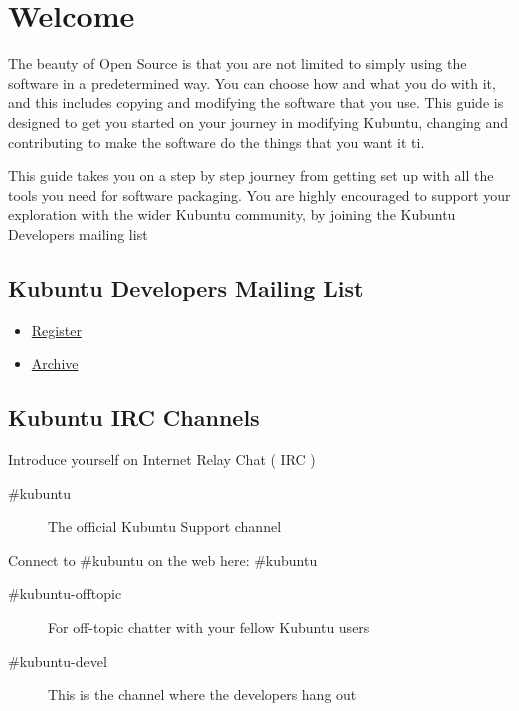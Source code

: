 \documentclass[letterpaper,10pt,english]{sphinxmanual}
\begin{document}
\section{Welcome}
\label{\detokenize{docs/packaging_guide/welcome::doc}}\label{\detokenize{docs/packaging_guide/welcome:welcome}}
The beauty of Open Source is that you are not limited to simply using the software in a predetermined way. You can choose how and what you do with it, and this includes copying and modifying the software that you use.
This guide is designed to get you started on your journey in modifying Kubuntu, changing and contributing to make the software do the things that you want it ti.

This guide takes you on a step by step journey from getting set up with all the tools you need for software packaging. You are highly encouraged to support your exploration with the wider Kubuntu community, by joining the Kubuntu Developers mailing list


\subsection{Kubuntu Developers Mailing List}
\label{\detokenize{docs/packaging_guide/welcome:kubuntu-developers-mailing-list}}\begin{itemize}
\item {} 
\href{https://lists.ubuntu.com/mailman/listinfo/kubuntu-devel}{Register}

\item {} 
\href{https://lists.ubuntu.com/archives/kubuntu-devel}{Archive}

\end{itemize}


\subsection{Kubuntu IRC Channels}
\label{\detokenize{docs/packaging_guide/welcome:kubuntu-irc-channels}}
Introduce yourself on Internet Relay Chat ( IRC )
\begin{description}
\item[{\#kubuntu}] \leavevmode
The official Kubuntu Support channel

\end{description}

Connect to \#kubuntu on the web here: \#kubuntu
\begin{description}
\item[{\#kubuntu-offtopic}] \leavevmode
For off-topic chatter with your fellow Kubuntu users

\item[{\#kubuntu-devel}] \leavevmode
This is the channel where the developers hang out

\end{description}
\end{document}
